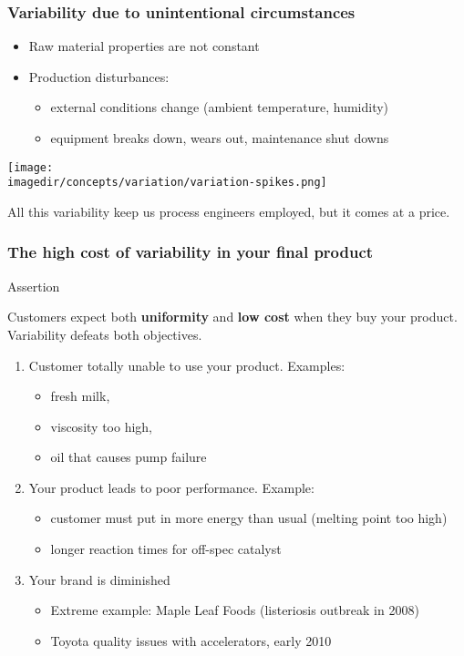 \begin{frame}\frametitle{Variability due to unintentional circumstances}
	\begin{itemize}
		\item	Raw material properties are not constant
		\item	Production disturbances:
		\begin{itemize}
			\item	external conditions change (ambient temperature, humidity)
			\item	equipment breaks down, wears out, maintenance shut downs
		\end{itemize}
	\end{itemize}

	\texttt{[image: \\imagedir/concepts/variation/variation-spikes.png]}

	All this variability keep us process engineers employed, but it comes at a price.
\end{frame}

\begin{frame}\frametitle{The high cost of variability in your final product}
	\begin{block}{\color{red} Assertion}
		\begin{center}
			Customers expect both \textbf{\color{myGreen}uniformity} and \textbf{\color{myGreen}low cost} when they buy your product. Variability defeats both objectives.
		\end{center}
	\end{block}
	
	\pause
	\begin{enumerate}
		\item	Customer totally unable to use your product. Examples:
		\begin{itemize}
			\item	fresh milk,
			\item	viscosity too high,
			\item	oil that causes pump failure
		\end{itemize}
		\pause
		\item	Your product leads to poor performance. Example:
		\begin{itemize}
			\item	customer must put in more energy than usual (melting point too high)
			\item	longer reaction times for off-spec catalyst
		\end{itemize}
		\pause
		\item	Your brand is diminished
		\begin{itemize}
			\item	Extreme example: Maple Leaf Foods (listeriosis outbreak in 2008)
			\item	Toyota quality issues with accelerators, early 2010
		\end{itemize}
	\end{enumerate}
\end{frame}

